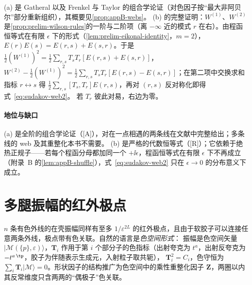 \begin{proofsketch}
(a) 是 Gatheral 以及 Frenkel 与 Taylor 的组合学论证（对色因子按“最大非阿贝尔”部分重新组织），其概要见\cref{prop:appB-webs}。
(b) 的完整证明：$W^{(1)}$、$W^{(2)}$ 是\cref{prop:prelim-wilson-rules}的一阶与二阶项（离 $-\infty$ 近的模式 $r$ 在右）。由程函恒等式在有限 $\epsilon$ 下的形式（\cref{lem:prelim-eikonal-identity}，$m=2$），
$E(r)E(s)=E(r,s)+E(s,r)$。于是 $\frac12(W^{(1)})^2=\frac12\sum_{r,s}T_sT_r[E(r,s)+E(s,r)]$，
$W^{(2)}-\frac12(W^{(1)})^2=\frac12\sum_{r,s}T_sT_r[E(r,s)-E(s,r)]$；在第二项中交换求和指标 $r\leftrightarrow s$ 得 $\frac12\sum_{r,s}[T_s,T_r]E(r,s)$，再对 $(r,s)$ 反对称化即得式~\eqref{eq:sudakov-web2}。
若 $T_r$ 彼此对易，右边为零。
\end{proofsketch}

\paragraph{地位与缺口}(a) 是全阶的组合学论证（[A]），对在一点相遇的两条线在文献中完整给出\cite{Gatheral1983,FrenkelTaylor1984}；多条线的 web 及其重整化本书不需要。
(b) 是严格的代数恒等式（[R]）；它依赖于绝热正规子——若每个程函分母都加同一个 $+\ii\epsilon$，程函恒等式在有限 $\epsilon$ 下不再成立（附录~B 的\cref{lem:appB-shuffle}），式~\eqref{eq:sudakov-web2} 只在 $\epsilon\to0$ 的分布意义下成立。
\section{多腿振幅的红外极点}\label{sec:sudakov-multileg}

$n$ 条有色外线的在壳振幅同样有至多 $1/\varepsilon^{2L}$ 的红外极点，且由于软胶子可以连接任意两条外线，极点带有色关联。自然的语言是\emph{色空间形式}：
振幅是色空间矢量 $|\mathcal M(\{p\},\varepsilon)\rangle$，$\mathbf T_i$ 作用于第 $i$ 个部分子的色指标（出射夸克为 $t^a$，出射反夸克为 $-t^{a\,\tp}$，胶子为伴随表示生成元，入射粒子取共轭），
$\mathbf T_i^2=C_i$，色守恒为 $\sum_i\mathbf T_i|\mathcal M\rangle=0$。形状因子的结构推广为色空间中的乘性重整化因子 $\mathbf Z$，两圈以内其反常维度只含两两的“偶极子”色关联。


